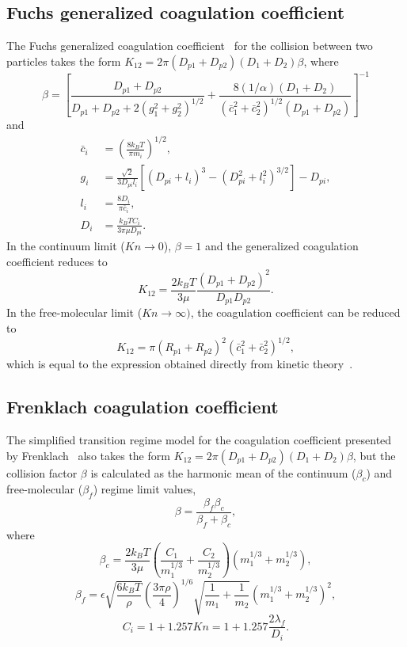 \documentclass[preprint,letterpaper]{elsarticle}
\begin{document}
\subsection{Fuchs generalized coagulation coefficient}
\label{a:FUCHS}
The Fuchs generalized coagulation coefficient~\cite{Fuchs_1964} for the collision between two particles takes the form $K_{12}=2\pi (D_{p1}+D_{p2})(D_1+D_2)\beta$, where
\begin{equation}
    \beta = \left[ \frac{D_{p1}+D_{p2}}{D_{p1}+D_{p2}+2(g_1^2+g_2^2)^{1/2}} + \frac{8(1/\alpha)(D_1+D_2)}{(\bar{c}_1^2+\bar{c}_2^2)^{1/2}(D_{p1}+D_{p2})} \right]^{-1}
\end{equation}
and 
\begin{align}
    \bar{c}_i &= \left( \frac{8k_B T}{\pi m_i} \right)^{1/2}, \\
    g_i &= \frac{\sqrt{2}}{3D_{pi}l_i} \left[ (D_{pi}+l_i)^3 - (D_{pi}^2+l_i^2)^{3/2} \right] - D_{pi}, \\
    l_i &= \frac{8D_i}{\pi \bar{c}_i}, \\
    D_i &= \frac{k_B T C_i}{3\pi \mu D_{pi}}.
\end{align}
In the continuum limit ($Kn \rightarrow 0$), $\beta=1$ and the generalized coagulation coefficient reduces to
\begin{equation}
    K_{12}=\frac{2k_BT}{3\mu} \frac{(D_{p1}+D_{p2})^2}{D_{p1}D_{p2}}.
\end{equation}
In the free-molecular limit ($Kn \rightarrow \infty)$, the coagulation coefficient can be reduced to
\begin{equation}
    K_{12} = \pi (R_{p1}+R_{p2})^2 (\bar{c}_1^2 + \bar{c}_2^2)^{1/2},
\end{equation}
which is equal to the expression obtained directly from kinetic theory~\cite{Seinfeld_2016}.

\subsection{Frenklach coagulation coefficient}
\label{a:FRENK}

The simplified transition regime model for the coagulation coefficient presented by Frenklach~\cite{Frenklach_2002b} also takes the form $K_{12}=2\pi (D_{p1}+D_{p2})(D_1+D_2)\beta$, but the collision factor $\beta$ is calculated as the harmonic mean of the continuum ($\beta_c$) and free-molecular ($\beta_f$) regime limit values,
\begin{equation}
    \beta = \frac{\beta_f \beta_c}{\beta_f + \beta_c},
\end{equation}
where
\begin{equation}
    \beta_c = \frac{2k_BT}{3 \mu} \left( \frac{C_1}{m_1^{1/3}} + \frac{C_2}{m_2^{1/3}} \right) (m_1^{1/3}+m_2^{1/3}),
\end{equation}
\begin{equation}
    \beta_f = \epsilon \sqrt{\frac{6k_BT}{\rho}} \left( \frac{3\pi \rho}{4} \right)^{1/6} \sqrt{\frac{1}{m_1}+\frac{1}{m_2}} (m_1^{1/3}+m_2^{1/3})^2,
\end{equation}
\begin{equation}
    C_i = 1 + 1.257Kn = 1 + 1.257 \frac{2\lambda_f}{D_i}.
\end{equation}
\end{document}
